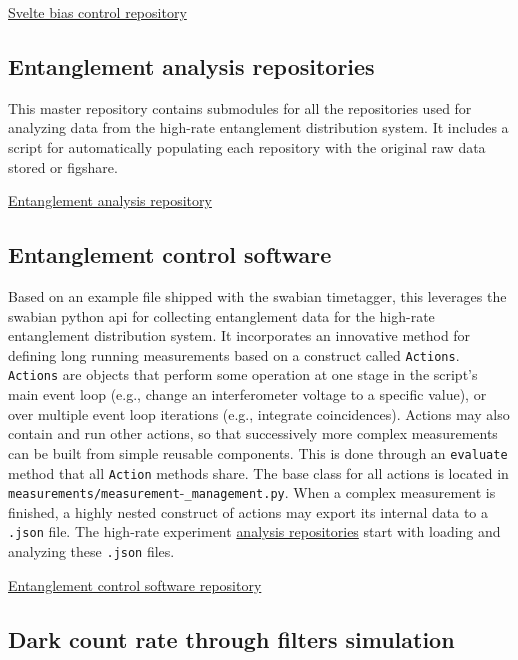 \documentclass[11pt]{caltech_thesis} %
\begin{document}
\href{https://github.com/sansseriff/snspd-bias-controll-svelte}{Svelte bias control repository}

\hypertarget{entanglement-analysis-repositories}{%
\subsection{Entanglement analysis repositories}\label{entanglement-analysis-repositories}}

This master repository contains submodules for all the repositories used for analyzing data from the high-rate entanglement distribution system. It includes a script for automatically populating each repository with the original raw data stored or figshare.

\href{https://github.com/sansseriff/highrate_origin}{Entanglement analysis repository}

\hypertarget{entanglement-control-software}{%
\subsection{Entanglement control software}\label{entanglement-control-software}}

Based on an example file shipped with the swabian timetagger, this leverages the swabian python api for collecting entanglement data for the high-rate entanglement distribution system. It incorporates an innovative method for defining long running measurements based on a construct called \texttt{Actions}. \texttt{Actions} are objects that perform some operation at one stage in the script's main event loop (e.g., change an interferometer voltage to a specific value), or over multiple event loop iterations (e.g., integrate coincidences). Actions may also contain and run other actions, so that successively more complex measurements can be built from simple reusable components. This is done through an \texttt{evaluate} method that all \texttt{Action} methods share. The base class for all actions is located in \texttt{measurements/measurement}-\texttt{\_management.py}. When a complex measurement is finished, a highly nested construct of actions may export its internal data to a \texttt{.json} file. The high-rate experiment \href{https://github.com/sansseriff/highrate_origin}{analysis repositories} start with loading and analyzing these \texttt{.json} files.

\href{https://github.com/sansseriff/swabian_entanglement_gui}{Entanglement control software repository}

\hypertarget{dark-count-rate-through-filters-simulation}{%
\subsection{Dark count rate through filters simulation}\label{dark-count-rate-through-filters-simulation}}
\end{document}
